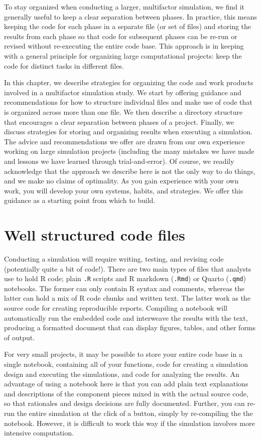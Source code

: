 \documentclass[
]{book}
\begin{document}
To stay organized when conducting a larger, multifactor simulation, we find it generally useful to keep a clear separation between phases.
In practice, this means keeping the code for each phase in a separate file (or set of files) and storing the results from each phase so that code for subsequent phases can be re-run or revised without re-executing the entire code base.
This approach is in keeping with a general principle for organizing large computational projects: keep the code for distinct tasks in different files.

In this chapter, we describe strategies for organizing the code and work products involved in a multifactor simulation study.
We start by offering guidance and recommendations for how to structure individual files and make use of code that is organized across more than one file.
We then describe a directory structure that encourages a clear separation between phases of a project.
Finally, we discuss strategies for storing and organizing results when executing a simulation.
The advice and recommendations we offer are drawn from our own experience working on large simulation projects (including the many mistakes we have made and lessons we have learned through trial-and-error).
Of course, we readily acknowledge that the approach we describe here is not the only way to do things, and we make no claims of optimality.
As you gain experience with your own work, you will develop your own systems, habits, and strategies.
We offer this guidance as a starting point from which to build.

\section{Well structured code files}\label{well-structured-code-files}

Conducting a simulation will require writing, testing, and revising code (potentially quite a bit of code!).
There are two main types of files that analysts use to hold R code; plain \texttt{.R} scripts and R markdown (\texttt{.Rmd}) or Quarto (\texttt{.qmd}) notebooks.
The former can only contain R syntax and comments, whereas the latter can hold a mix of R code chunks and written text.
The latter work as the source code for creating reproducible reports.
Compiling a notebook will automatically run the embedded code and interweave the results with the text, producing a formatted document that can display figures, tables, and other forms of output.

For very small projects, it may be possible to store your entire code base in a single notebook, containing all of your functions, code for creating a simulation design and executing the simulations, and code for analyzing the results.
An advantage of using a notebook here is that you can add plain text explanations and descriptions of the component pieces mixed in with the actual source code, so that rationales and design decisions are fully documented.
Further, you can re-run the entire simulation at the click of a button, simply by re-compiling the the notebook.
However, it is difficult to work this way if the simulation involves more intensive computation.
\end{document}

